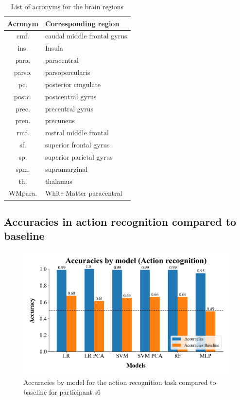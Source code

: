 \documentclass[10pt,conference,compsocconf]{IEEEtran}
\begin{document}
\begin{table}[h!]
    \centering
    \begin{tabular}{| c | l |}
        \hline
        Acronym & Corresponding region \\
        \hline
        cmf. & caudal middle frontal gyrus \\
        ins. & Insula \\
        para. & paracentral \\
        parso. & parsopercularis \\
        pc. & posterior cingulate \\
        postc. & postcentral gyrus \\
        prec. & precentral gyrus \\
	      pren. & precuneus \\
        rmf. & rostral middle frontal \\
        sf. & superior frontal gyrus \\
	      sp. & superior parietal gyrus \\
	      spm. & supramarginal \\
	      th. & thalamus \\
        WMpara. & White Matter paracentral \\
        \hline
    \end{tabular}
    \caption{List of acronyms for the brain regions}
    \label{apptab:acronyms}
\end{table}

\subsection{Accuracies in action recognition compared to baseline}

\begin{figure}[h!]
    \center
    \includegraphics[width=\linewidth]{../Code/figures/accuracies_ExObs.png}
    \caption{Accuracies by model for the action recognition task compared to baseline for participant s6}
    \label{appfig:accuracies_ExObs}
\end{figure}
\FloatBarrier
\end{document}
